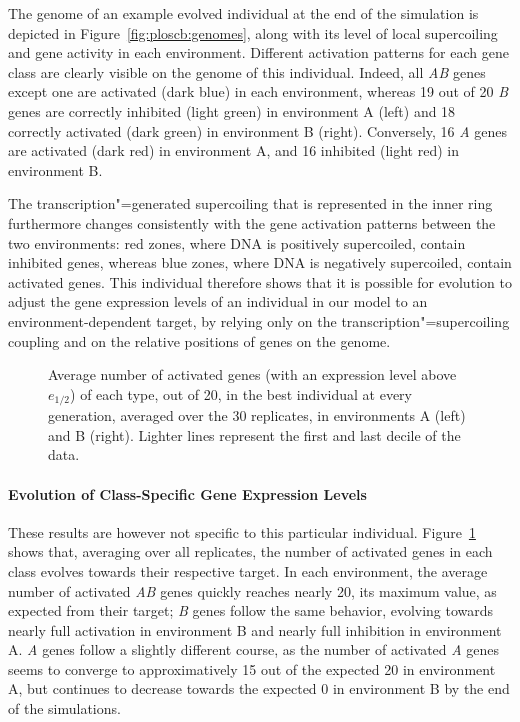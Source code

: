 The genome of an example evolved individual at the end of the simulation is depicted in Figure~\ref{fig:ploscb:genomes}, along with its level of local supercoiling and gene activity in each environment.
Different activation patterns for each gene class are clearly visible on the genome of this individual.
Indeed, all \emph{AB} genes except one are activated (dark blue) in each environment, whereas 19 out of 20 \emph{B} genes are correctly inhibited (light green) in environment A (left) and 18 correctly activated (dark green) in environment B (right).
Conversely, 16 \emph{A} genes are activated (dark red) in environment A, and 16 inhibited (light red) in environment B.

The transcription"=generated supercoiling that is represented in the inner ring furthermore changes consistently with the gene activation patterns between the two environments: red zones, where DNA is positively supercoiled, contain inhibited genes, whereas blue zones, where DNA is negatively supercoiled, contain activated genes.
This individual therefore shows that it is possible for evolution to adjust the gene expression levels of an individual in our model to an environment-dependent target, by relying only on the transcription"=supercoiling coupling and on the relative positions of genes on the genome.

\begin{figure}[H]
\begin{elasticrow}[width=\textwidth]
\end{elasticrow}
\caption[Average number of activated genes during evolution in the advanced model]{Average number of activated genes (with an expression level above $e_{1/2}$) of each type, out of 20, in the best individual at every generation, averaged over the 30 replicates, in environments A (left) and B (right).
Lighter lines represent the first and last decile of the data.}
\label{fig:ploscb:gene_activity_by_env}
\end{figure}

\paragraph{Evolution of Class-Specific Gene Expression Levels}
These results are however not specific to this particular individual.
Figure~\ref{fig:ploscb:gene_activity_by_env} shows that, averaging over all replicates, the number of activated genes in each class evolves towards their respective target.
In each environment, the average number of activated \emph{AB} genes quickly reaches nearly 20, its maximum value, as expected from their target; \emph{B} genes follow the same behavior, evolving towards nearly full activation in environment B and nearly full inhibition in environment A.
\emph{A} genes follow a slightly different course, as the number of activated \emph{A} genes seems to converge to approximatively 15 out of the expected 20 in environment A, but continues to decrease towards the expected 0 in environment B by the end of the simulations.


